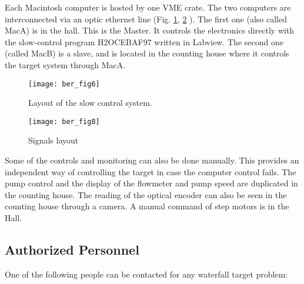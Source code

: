 Each Macintosh computer is hosted by one VME crate. The two computers are
interconnected via an optic ethernet line
(Fig. \ref{fig:control1}, \ref{fig:control2} ). 
The first one (also called MacA) is in the hall. This is the Master.
It controls the electronics directly with the slow-control program H2OCEBAF97 
written in Labview.
The second one (called MacB) is a slave, and is located in 
the counting house where it controls the target system through MacA.

\begin{figure}[hp]
\begin{center}
\texttt{[image: ber\_fig6]}
\caption[Waterfall Target: Slow Controls]{Layout of the slow control system.}
\label{fig:control1}
\end{center}
\end{figure}
 
\begin{figure}[hp]
\begin{center}
\texttt{[image: ber\_fig8]}
\caption[Waterfall Target: Signal Layout]{Signals layout}
\label{fig:control2}
\end{center}
\end{figure}


Some of the controls and monitoring can also be done manually. This provides 
an independent way of controlling the target in case 
the computer control fails.
The pump control and the display of the flowmeter and pump speed are 
duplicated in the counting house. The reading of the optical encoder 
can also be seen in the counting house through a camera.
A manual command of step motors is in the Hall.


\subsection{Authorized Personnel}

One of the following people can be contacted for any waterfall target problem:

